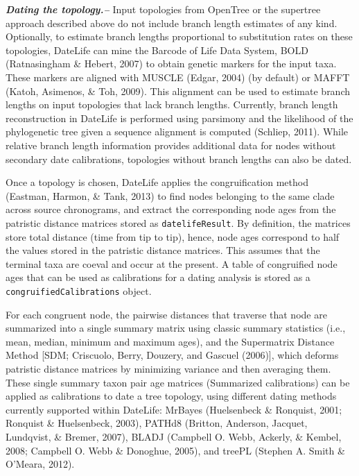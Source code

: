 \documentclass[
  english,
  man]{apa6}
\begin{document}
\emph{\textbf{Dating the topology.--}}
Input topologies from OpenTree or the supertree approach described above do not include branch length estimates of any kind.
Optionally, to estimate branch lengths proportional to substitution rates on these topologies, DateLife can mine the Barcode of Life Data System, BOLD (Ratnasingham \& Hebert, 2007) to obtain genetic markers for the input taxa.
These markers are aligned with MUSCLE (Edgar, 2004) (by default) or MAFFT (Katoh, Asimenos, \& Toh, 2009).
This alignment can be used to estimate branch lengths on input topologies that lack branch lengths.
Currently, branch length reconstruction in DateLife is performed using parsimony and the likelihood of the phylogenetic tree given a sequence alignment is computed (Schliep, 2011).
While relative branch length information provides additional data for nodes without secondary date calibrations, topologies without branch lengths can also be dated.

Once a topology is chosen, DateLife applies the congruification method (Eastman, Harmon, \& Tank, 2013) to find nodes belonging to the same clade across source chronograms, and extract the corresponding node ages from the patristic distance matrices stored as \texttt{datelifeResult}. By definition, the matrices store total distance (time from tip to tip), hence, node ages correspond to half the values stored in the patristic distance matrices.
This assumes that the terminal taxa are coeval and occur at the present.
A table of congruified node ages that can be used as calibrations for a dating analysis is stored as a \texttt{congruifiedCalibrations} object.

For each congruent node, the pairwise distances that traverse that node are summarized into a single summary matrix using classic summary statistics (i.e., mean, median, minimum and maximum ages), and the Supermatrix Distance Method {[}SDM; Criscuolo, Berry, Douzery, and Gascuel (2006){]}, which deforms patristic distance matrices by minimizing variance and then averaging them.
These single summary taxon pair age matrices (Summarized calibrations) can be applied as calibrations to date a tree topology, using different dating methods currently supported within DateLife: MrBayes (Huelsenbeck \& Ronquist, 2001; Ronquist \& Huelsenbeck, 2003), PATHd8 (Britton, Anderson, Jacquet, Lundqvist, \& Bremer, 2007), BLADJ (Campbell O. Webb, Ackerly, \& Kembel, 2008; Campbell O. Webb \& Donoghue, 2005), and treePL (Stephen A. Smith \& O'Meara, 2012).
\end{document}
